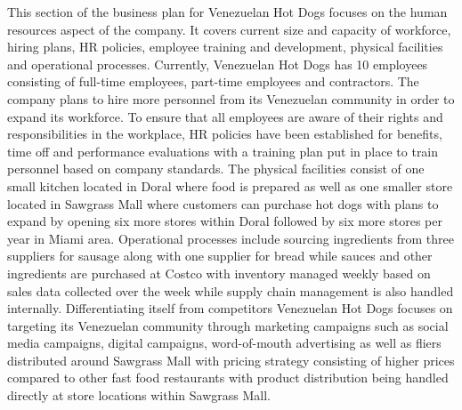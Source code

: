 

This section of the business plan for Venezuelan Hot Dogs focuses on the human resources aspect of the company. It covers current size and capacity of workforce, hiring plans, HR policies, employee training and development, physical facilities and operational processes. Currently, Venezuelan Hot Dogs has 10 employees consisting of full-time employees, part-time employees and contractors. The company plans to hire more personnel from its Venezuelan community in order to expand its workforce. To ensure that all employees are aware of their rights and responsibilities in the workplace, HR policies have been established for benefits, time off and performance evaluations with a training plan put in place to train personnel based on company standards. The physical facilities consist of one small kitchen located in Doral where food is prepared as well as one smaller store located in Sawgrass Mall where customers can purchase hot dogs with plans to expand by opening six more stores within Doral followed by six more stores per year in Miami area. Operational processes include sourcing ingredients from three suppliers for sausage along with one supplier for bread while sauces and other ingredients are purchased at Costco with inventory managed weekly based on sales data collected over the week while supply chain management is also handled internally. Differentiating itself from competitors Venezuelan Hot Dogs focuses on targeting its Venezuelan community through marketing campaigns such as social media campaigns, digital campaigns, word-of-mouth advertising as well as fliers distributed around Sawgrass Mall with pricing strategy consisting of higher prices compared to other fast food restaurants with product distribution being handled directly at store locations within Sawgrass Mall.